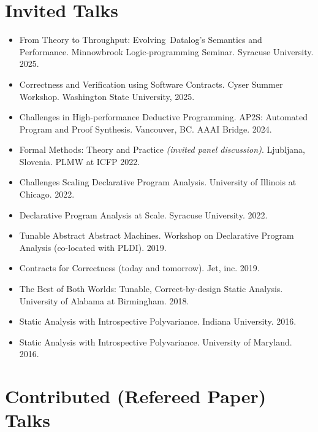 \documentclass[line]{res}
\begin{document}
\begin{resume}
\section{\large Invited Talks} \vspace{0.2in}
\begin{itemize}
\item From Theory to Throughput: Evolving Datalog’s Semantics and Performance. Minnowbrook Logic-programming Seminar. Syracuse University. 2025.
\item Correctness and Verification using Software Contracts. Cyser Summer Workshop. Washington State University, 2025.
\item Challenges in High-performance Deductive Programming. AP2S: Automated Program and Proof Synthesis. Vancouver, BC. AAAI Bridge. 2024. 
\item Formal Methods: Theory and Practice \textit{(invited panel discussion)}. Ljubljana, Slovenia. PLMW at ICFP 2022.
\item Challenges Scaling Declarative Program Analysis. University of Illinois at Chicago. 2022.
\item Declarative Program Analysis at Scale. Syracuse University. 2022.
\item Tunable Abstract Abstract Machines. Workshop on Declarative Program Analysis (co-located with PLDI). 2019.
\item Contracts for Correctness (today and tomorrow). Jet, inc. 2019.
\item The Best of Both Worlds: Tunable, Correct-by-design Static Analysis. University of Alabama at Birmingham. 2018.
\item Static Analysis with Introspective Polyvariance. Indiana University. 2016.
\item Static Analysis with Introspective Polyvariance. University of Maryland. 2016.
\end{itemize}

\section{\large Contributed (Refereed Paper) Talks} \vspace{0.2in}



\end{resume}

\end{document}
